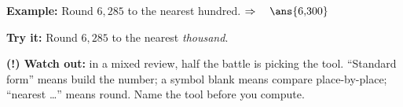 \documentclass[12pt]{article}
\begin{document}
\begin{examplebox}
\textbf{Example:} \quad Round $6{,}285$ to the nearest hundred.
$\Rightarrow\quad \ans{6{,}300}$
\end{examplebox}

\begin{tryitbox}
\textbf{Try it:} \quad Round $6{,}285$ to the nearest \emph{thousand}.\\[2pt]
\end{tryitbox}

\begin{watchoutbox}
\textbf{(!) Watch out:} in a mixed review, half the battle is picking the tool.
``Standard form'' means build the number; a symbol blank means compare
place-by-place; ``nearest \ldots'' means round. Name the tool before you
compute.
\end{watchoutbox}
\end{document}
